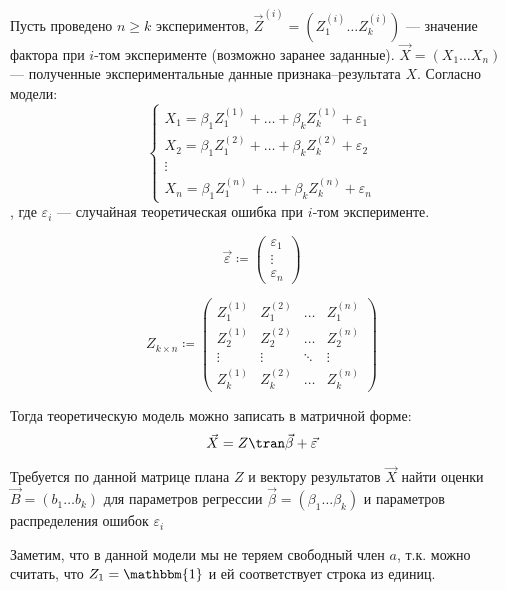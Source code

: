 Пусть проведено \(n \geq k\) экспериментов, \(\vec{Z}^{(i)} = (Z_1^{(i)} \dots Z_k^{(i)})\) --- значение фактора при \(i\)-том эксперименте (возможно заранее заданные). \(\vec{X} = (X_1 \dots X_n)\) --- полученные экспериментальные данные признака--результата \(X\). Согласно модели:
\[\begin{cases}
        X_1 = \beta_1 Z_1^{(1)} + \dots + \beta_k Z_k^{(1)} + \varepsilon_1 \\
        X_2 = \beta_1 Z_1^{(2)} + \dots + \beta_k Z_k^{(2)} + \varepsilon_2 \\
        \vdots                                                              \\
        X_n = \beta_1 Z_1^{(n)} + \dots + \beta_k Z_k^{(n)} + \varepsilon_n
    \end{cases}\]
, где \(\varepsilon_i\) --- случайная теоретическая ошибка при \(i\)-том эксперименте.
\begin{obozn}
    \[\vec{\varepsilon} \coloneqq \begin{pmatrix}
            \varepsilon_1 \\
            \vdots        \\
            \varepsilon_n
        \end{pmatrix}\]
\end{obozn}
\begin{obozn}
    \[Z_{k \times n} \coloneqq \begin{pmatrix}
            Z_1^{(1)} & Z_1^{(2)} & \dots  & Z_1^{(n)} \\
            Z_2^{(1)} & Z_2^{(2)} & \dots  & Z_2^{(n)} \\
            \vdots    & \vdots    & \ddots & \vdots    \\
            Z_k^{(1)} & Z_k^{(2)} & \dots  & Z_k^{(n)}
        \end{pmatrix}\]
\end{obozn}

Тогда теоретическую модель можно записать в матричной форме:
\[\vec{X} = Z\tran \vec{\beta} + \vec{\varepsilon}\]

Требуется по данной матрице плана \(Z\) и вектору результатов \(\vec{X}\) найти оценки \(\vec{B} = (b_1 \dots b_k)\) для параметров регрессии \(\vec{\beta} = (\beta_1 \dots \beta_k)\) и параметров распределения ошибок \(\varepsilon_i\)

\begin{remark}
    Заметим, что в данной модели мы не теряем свободный член \(a\), т.к. можно считать, что \(Z_1 = \mathbbm{1}\) и ей соответствует строка из единиц.
\end{remark}

